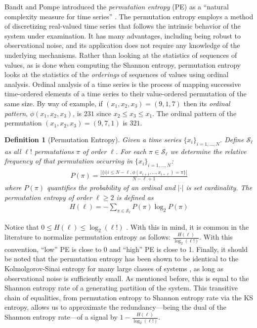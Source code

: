 \documentclass[%
pre,
reprint,
superscriptaddress,
showpacs,
nofootinbib,
nobibnotes,
 amsmath,amssymb,
 aps,
]{revtex4-1}
\newtheorem*{mydef}{Definition}
\begin{document}
Bandt and Pompe introduced the \emph{permutation entropy} (PE) as a
``natural complexity measure for time series''
\cite{bandt2002per}. The permutation entropy employs a method of
discretizing real-valued time series that follows the intrinsic
behavior of the system under examination.  It has many advantages,
including being robust to observational noise, and its application
does not require any knowledge of the underlying mechanisms.  Rather
than looking at the statistics of sequences of values, as is done when
computing the Shannon entropy, permutation entropy looks at the
statistics of the \emph{orderings} of sequences of values using
ordinal analysis. Ordinal analysis of a time series is the process of
mapping successive time-ordered elements of a time series to their
value-ordered permutation of the same size.  By way of example, if
$(x_1, x_2, x_3) = (9, 1, 7)$ then its \emph{ordinal pattern},
$\phi(x_1, x_2, x_3)$, is $231$ since $x_2 \leq x_3 \leq x_1$.  The
ordinal pattern of the permutation $(x_1, x_2, x_3) = (9, 7, 1)$ is
$321$.

\begin{mydef}[Permutation Entropy]

  Given a time series $\{x_i\}_{i = 1,\dots,N}$. Define $\mathcal{S}_\ell$ as all $\ell!$ permutations $\pi$ of order $\ell$. For each $\pi \in \mathcal{S}_\ell$ we determine the relative frequency of that permutation occurring in $\{x_i\}_{i = 1,\dots,N}$:
  \begin{align*}
    P(\pi) = \frac{\left|\{i|i \leq N-\ell,\phi(x_{i+1},\dots,x_{i+\ell}) = \pi\}\right|}{N-\ell+1}
  \end{align*}
  where $P(\pi)$ quantifies the probability of an ordinal and
  $|\cdot|$ is set cardinality. The \emph{permutation entropy} of
  order $\ell \ge 2$ is defined as
  \begin{align*}
    H(\ell) = - \sum_{\pi \in \mathcal{S}_\ell} P(\pi) \log_2 P(\pi)
  \end{align*}

\end{mydef}

Notice that $0\le H(\ell) \le \log_2(\ell!)$ \cite{bandt2002per}.
With this in mind, it is common in the literature to normalize
permutation entropy as follows: $\frac{H(\ell)}{\log_2(\ell!)}$.  With
this convention, ``low'' PE is close to 0 and ``high'' PE is close to
1. Finally, it should be noted that the permutation entropy has been
shown to be identical to the Kolmolgorov-Sinai entropy for many large
classes of systems \cite{amigo2012permutation}, as long as
observational noise is sufficiently small. As mentioned before, this
is equal to the Shannon entropy rate of a generating partition of the
system. This transitive chain of equalities, from permutation entropy
to Shannon entropy rate via the KS entropy, allows us to approximate
the redundancy---being the dual of the Shannon entropy rate---of a
signal by $1 - \frac{H(\ell)}{\log_2(\ell!)}$.
\end{document}
